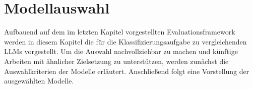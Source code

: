 \chapter{Modellauswahl}\label{ch:modellauswahl}

Aufbauend auf dem im letzten Kapitel vorgestellten Evaluationsframework werden in diesem Kapitel die für die Klassifizierungsaufgabe zu vergleichenden \acp{LLM} vorgestellt. Um die Auswahl nachvollziehbar zu machen und künftige Arbeiten mit ähnlicher Zielsetzung zu unterstützen, werden zunächst die Auswahlkriterien der Modelle erläutert. Anschließend folgt eine Vorstellung der ausgewählten Modelle.


